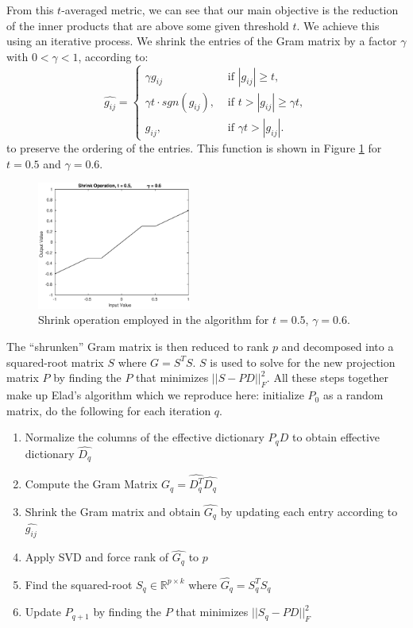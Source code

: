 \documentclass[journal]{IEEEtran}
\begin{document}
From this $t$-averaged metric, we can see that our main objective is the reduction of the inner products that are above some given threshold $t$.  We achieve this using an iterative process.  We shrink the entries of the Gram matrix by a factor $\gamma$ with $ 0 < \gamma < 1$, according to: $$ \hat{g_{ij}} = \begin{cases} \gamma g_{ij} & \mbox{ if } |g_{ij}| \geq t, \\ \gamma t \cdot sgn(g_{ij}), & \mbox{ if } t > |g_{ij}| \geq \gamma t, \\ g_{ij}, & \mbox{ if } \gamma t > |g_{ij}|. \end{cases} $$ to preserve the ordering of the entries.  This function is shown in Figure \ref{fig:shrink} for $t = 0.5$ and $\gamma = 0.6$.

\begin{figure}[]
  \centering
  \includegraphics[width=0.45\textwidth]{shrink.eps}
  \caption{Shrink operation employed in the algorithm for $t = 0.5$, $\gamma = 0.6$.}
  \label{fig:shrink}
\end{figure}

The ``shrunken'' Gram matrix is then reduced to rank $p$ and decomposed into a squared-root matrix $S$ where $G = S^TS$.  $S$ is used to solve for the new projection matrix $P$ by finding the $P$ that minimizes $ || S - PD ||_F^2$.  All these steps together make up Elad's algorithm which we reproduce here:  initialize $P_0$ as a random matrix, do the following for each iteration $q$.
\begin{enumerate}
\item Normalize the columns of the effective dictionary $P_q D$ to obtain effective dictionary $\hat{D_q}$
\item Compute the Gram Matrix $G_q = \hat{D_q^T} \hat{D_q}$
\item Shrink the Gram matrix and obtain $\hat{G_q}$ by updating each entry according to $\hat{g_{ij}}$
\item Apply SVD and force rank of $\hat{G_q}$ to $p$
\item Find the squared-root $S_q \in \mathbb{R}^{p \times k}$ where $\hat{G_q} = S_q^TS_q$
\item Update $P_{q+1}$ by finding the $P$ that minimizes $|| S_q - PD ||_F^2$
\end{enumerate}
\end{document}
